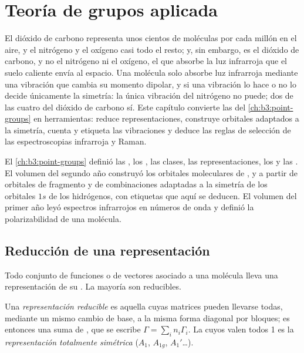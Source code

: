 \chapter{Teoría de grupos aplicada}\label{ch:b3:group-theory-applied}

El dióxido de carbono representa unos cientos de moléculas por cada millón en el
aire, y el nitrógeno y el oxígeno casi todo el resto; y, sin embargo, es el dióxido de carbono, y no
el nitrógeno ni el oxígeno, el que absorbe la luz infrarroja que el suelo caliente envía al
espacio. Una molécula solo absorbe luz infrarroja mediante una vibración que
cambia su momento dipolar, y si una vibración lo hace o no lo decide únicamente la
simetría: la única vibración del nitrógeno no puede; dos de las cuatro del dióxido de carbono
sí. Este capítulo convierte las  del
\cref{ch:b3:point-groups} en herramientas: reduce representaciones, construye
orbitales adaptados a la simetría, cuenta y etiqueta las vibraciones y deduce las
reglas de selección de las espectroscopias infrarroja y Raman.

\begin{recall}
El \cref{ch:b3:point-groups} definió las , los ,
las clases, las representaciones, los  y las . El volumen del
segundo año construyó los orbitales moleculares de ,  y  a partir de
orbitales de fragmento y de combinaciones adaptadas a la simetría de los orbitales $1s$ de los
hidrógenos, con etiquetas que aquí se deducen. El volumen del primer año
leyó espectros infrarrojos en números de onda y definió la polarizabilidad de una
molécula.
\end{recall}

\section{Reducción de una representación}

Todo conjunto de funciones o de vectores asociado a una molécula lleva una
representación de su . La mayoría son reducibles.

\begin{definition}\label{def:b3:group-theory-applied:reducible}
Una \emph{representación reducible} es aquella
cuyas matrices pueden llevarse todas, mediante un mismo cambio de base, a la misma
forma diagonal por bloques; es entonces una suma de ,
que se escribe $\Gamma = \sum_in_i\Gamma_i$. La  cuyos
 valen todos 1 es la \emph{representación totalmente
simétrica} ($A_1$, $A_{1g}$,
$A_1'$\dots).
\end{definition}


